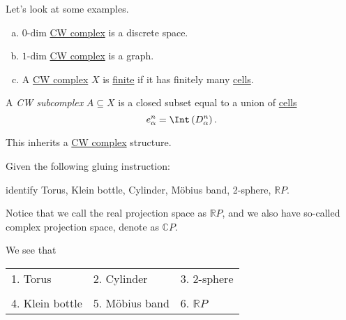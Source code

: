\begin{eg}
	Let's look at some examples.
	\begin{enumerate}[(a)]
		\item \(0\)-dim \hyperref[def:CW-Complex]{CW complex} is a discrete space.
		\item \(1\)-dim \hyperref[def:CW-Complex]{CW complex} is a graph.
		\item A \hyperref[def:CW-Complex]{CW complex} \(X\) is \underline{finite} if it has finitely many \hyperref[def:cell]{cells}.
	\end{enumerate}
\end{eg}

\begin{definition}[CW subcomplex]\label{def:CW-subcomplex}
	A \emph{CW subcomplex} \(A\subseteq X\) is a closed subset equal to a union of \hyperref[def:cell]{cells}
	\[
		e^n_{\alpha} = \Int \left(D^n_{\alpha}\right).
	\]
\end{definition}

\begin{remark}
	This inherits a \hyperref[def:CW-Complex]{CW complex} structure.
\end{remark}

\begin{exercise}
	Given the following gluing instruction:
	\begin{center}
	\end{center}
	identify Torus, Klein bottle, Cylinder, Möbius band, 2-sphere, \(\mathbb{R} P\).
	\begin{notation}
		Notice that we call the real projection space as \(\mathbb{R} P\), and we also have so-called
		complex projection space, denote as \(\mathbb{C} P\).
	\end{notation}
\end{exercise}
\begin{answer}
	We see that
	\begin{table}[H]
		\centering
		\begin{tabular}{lll}
			1. Torus        & 2. Cylinder    & 3. 2-sphere                 \\\\
			4. Klein bottle & 5. Möbius band & 6.         \(\mathbb{R} P\) \\
		\end{tabular}
	\end{table}
\end{answer}